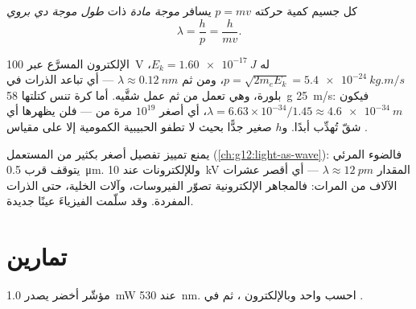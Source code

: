 \begin{definition}\label{def:g12:quantum-world:debroglie}
كل جسيم كمية حركته $p = mv$ يسافر \emph{موجة
مادة} ذات \emph{طول موجة دي بروي}
\[
\lambda = \frac{h}{p} = \frac{h}{mv}.
\]
\end{definition}
\admitted

\begin{example}\label{ex:g12:quantum-world:never}
الإلكترون المسرَّع عبر \qty{100}{V} له $E_k = \qty{1.60e-17}{J}$،
$p = \sqrt{2m_e E_k} = \qty{5.4e-24}{kg.m/s}$، ومن ثم $\lambda \approx
\qty{0.12}{nm}$ --- أي تباعد الذرات في بلورة، وهي تعمل من ثم
عمل شقَّيه. أما كرة تنس كتلتها \qty{58}{g}  \qty{25}{m/s}: فيكون $\lambda =
6.63\times10^{-34}/1.45 \approx \qty{4.6e-34}{m}$، أي أصغر $10^{19}$ مرة
من  --- فلن يظهرها أي شقّ تُهدِّب أبدًا. و$h$ صغير جدًّا
بحيث لا تطفو الحبيبية الكمومية إلا على مقياس .
\end{example}

\begin{example}\label{ex:g12:quantum-world:microscope}
يمنع  تمييز تفصيل أصغر بكثير من  المستعمل
(\cref{ch:g12:light-as-wave}): فالضوء المرئي يتوقف قرب \qty{0.5}{\micro m}.
وللإلكترونات عند \qty{10}{kV} المقدار $\lambda \approx \qty{12}{pm}$ --- أي أقصر عشرات
الآلاف من المرات: فالمجاهر الإلكترونية تصوّر الفيروسات، وآلات
الخلية، حتى الذرات المفردة. وقد سلّمت  الفيزياءَ عينًا جديدة.
\end{example}

\section{تمارين}

\begin{exercise}[$\star$]\label{exo:g12:quantum-world:1}
مؤشّر  أخضر يصدر \qty{1.0}{mW} عند \qty{530}{nm}. احسب 
 واحد  وبالإلكترون ، ثم  في .
\end{exercise}

